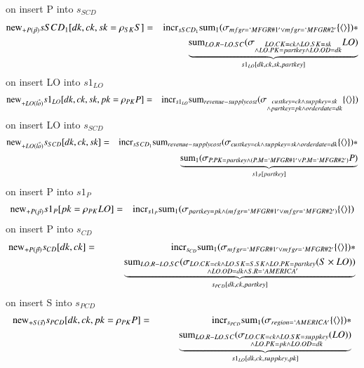 on insert P into $s_{SCD}$
\begin{eqnarray}
\mathrm{new}_{+P(\vec{p})} sSCD_{1} [ dk, ck, sk = \rho_{SK} S]
&=& \mathrm{incr}_{sSCD_{1}}
\mathrm{sum}_{1} (\sigma_{mfgr = `MFGR\#1' \vee mfgr = `MFGR\#2'} \{{\langle\rangle}\}) *
\\\nonumber&&\qquad
\underbrace{\mathrm{sum}_{LO.R - LO.SC} (\sigma_{\substack{ LO.CK = ck \wedge LO.SK = sk \\\wedge LO.PK = partkey \wedge LO.OD = dk}} LO)}_{s1_{LO}[dk,ck,sk, partkey]}
\end{eqnarray}
on insert LO into $s1_{LO}$
\begin{eqnarray}
\mathrm{new}_{+LO(\vec{lo})} s1_{LO} [dk, ck, sk, pk = \rho_{PK} P] &=&
\mathrm{incr}_{s1_{LO}} 
\mathrm{sum}_{revenue - supplycost} (\sigma_{\substack{ custkey = ck \wedge suppkey = sk \\\wedge partkey = pk \wedge orderdate = dk}} \{{\langle\rangle}\} ) 
\end{eqnarray}
on insert LO into $s_{SCD}$
\begin{eqnarray}
\mathrm{new}_{+LO(\vec{lo})} s_{SCD} [dk, ck, sk] 
&=& \mathrm{incr}_{sSCD_{1}}
\mathrm{sum}_{revenue - supplycost} (\sigma_{custkey = ck \wedge suppkey = sk \wedge orderdate = dk} \{{\langle\rangle}\}) *
\\\nonumber&&\qquad
\underbrace{\mathrm{sum}_{1} (\sigma_{P.PK = partkey \wedge (P.M = `MFGR\#1' \vee P.M = `MFGR\#2')} P)}_{s1_{P}[partkey]} 
\end{eqnarray}
on insert P into $s1_{P}$
\begin{eqnarray}
\mathrm{new}_{+P(\vec{p})} s1_{P} [pk = \rho_{PK} LO] &=&
\mathrm{incr}_{s1_{P}} \mathrm{sum}_{1} ( \sigma_{partkey = pk \wedge (mfgr = `MFGR\#1' \vee mfgr = `MFGR\#2')} \{{\langle\rangle}\})
\end{eqnarray}
on insert P into $s_{CD}$
\begin{eqnarray}
\mathrm{new}_{+P(\vec{p})} s_{CD} [dk, ck] &=& 
\mathrm{incr}_{s_{CD}} \mathrm{sum}_{1} (\sigma_{mfgr = `MFGR\#1' \vee mfgr = `MFGR\#2'} \{{\langle\rangle}\}) *
\\\nonumber&&\qquad
\underbrace{\mathrm{sum}_{LO.R - LO.SC} (\sigma_{\substack{LO.CK = ck \wedge LO.SK = S.SK \wedge LO.PK = partkey \\\wedge LO.OD = dk \wedge S.R = `AMERICA' }} (S \times LO) )}_{s_{PCD}[dk,ck,partkey]}
\end{eqnarray}
on insert S into $s_{PCD}$
\begin{eqnarray}
\mathrm{new}_{+S(\vec{s})} s_{PCD} [dk, ck, pk = \rho_{PK} P] &=& 
\mathrm{incr}_{s_{PCD}} \mathrm{sum}_{1} (\sigma_{region = `AMERICA'} \{{\langle\rangle}\}) *
\\\nonumber&&\qquad
\underbrace{\mathrm{sum}_{LO.R - LO.SC} (\sigma_{\substack{LO.CK = ck \wedge LO.SK = suppkey \\\wedge LO.PK = pk \wedge LO.OD = dk }} (LO) )}_{s1_{LO}[dk, ck, suppkey, pk]}
\end{eqnarray}
